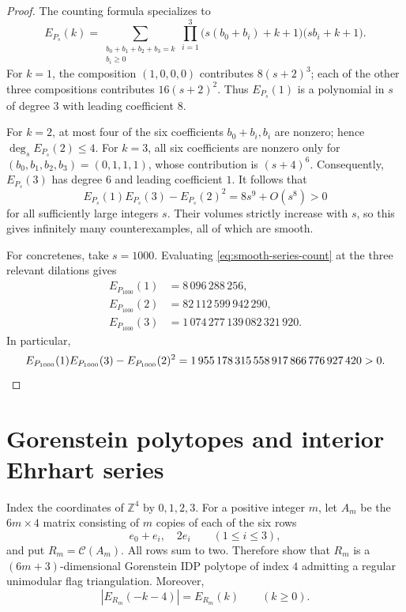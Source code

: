 \documentclass[11pt, letterpaper, english]{amsart}
\theoremstyle{teoremas}
\theoremstyle{definition}
\newcommand{\Z}{\mathbb{Z}}
\newcommand{\cC}{\mathcal C}
\begin{document}
\begin{proof}
The counting formula specializes to
\begin{equation}\label{eq:smooth-series-count}
 E_{P_s}(k)=\sum_{\substack{b_0+b_1+b_2+b_3=k\\b_i\ge0}}
 \prod_{i=1}^3\bigl(s(b_0+b_i)+k+1\bigr)\bigl(sb_i+k+1\bigr).
\end{equation}
For $k=1$, the composition $(1,0,0,0)$ contributes
$8(s+2)^3$; each of the other three compositions contributes
$16(s+2)^2$. Thus $E_{P_s}(1)$ is a polynomial in $s$ of degree
$3$ with leading coefficient $8$.

For $k=2$, at most four of the six coefficients
$b_0+b_i,b_i$ are nonzero; hence $\deg_s E_{P_s}(2)\le4$.
For $k=3$, all six coefficients are nonzero only for
$(b_0,b_1,b_2,b_3)=(0,1,1,1)$, whose contribution is $(s+4)^6$.
Consequently, $E_{P_s}(3)$ has degree $6$ and leading coefficient
$1$. It follows that
\[
 E_{P_s}(1)E_{P_s}(3)-E_{P_s}(2)^2=8s^9+O(s^8)>0
\]
for all sufficiently large integers $s$. Their volumes strictly
increase with $s$, so this gives infinitely many counterexamples,
all of which are smooth.

For concretenes, take $s=1000$. Evaluating
\eqref{eq:smooth-series-count} at the three relevant dilations gives
\begin{align*}
 E_{P_{1000}}(1)&=8\,096\,288\,256,\\
 E_{P_{1000}}(2)&=82\,112\,599\,942\,290,\\
 E_{P_{1000}}(3)&=1\,074\,277\,139\,082\,321\,920.
\end{align*}
In particular,
\[
 E_{P_{1000}}(1)E_{P_{1000}}(3)-E_{P_{1000}}(2)^2
 =1\,955\,178\,315\,558\,917\,866\,776\,927\,420>0.\qedhere
\]
\end{proof}



\section{Gorenstein polytopes and interior Ehrhart series}\label{sec:interior}

Index the coordinates of $\Z^4$ by $0,1,2,3$. For a positive integer
$m$, let $A_m$ be the $6m\times4$ matrix consisting of $m$ copies
of each of the six rows
\[
 e_0+e_i,\quad 2e_i\qquad(1\le i\le3),
\]
and put $R_m=\cC(A_m)$. All rows sum to two. Therefore
 show that $R_m$
is a $(6m+3)$-dimensional Gorenstein IDP polytope of index $4$
admitting a regular unimodular flag triangulation. Moreover,
\begin{equation}\label{eq:R-translation}
 |E_{R_m}(-k-4)|=E_{R_m}(k)\qquad(k\ge0).
\end{equation}
\end{document}
